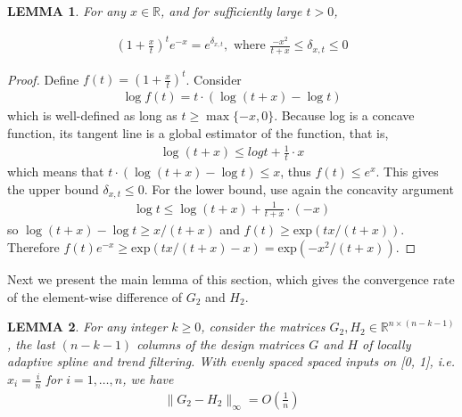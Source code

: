 \documentclass[a4paper]{article}
\newtheorem{lemma}{LEMMA}
\newcommand{\RR}{\mathbb{R}}
\begin{document}
\begin{lemma}
For any $x\in\RR$, and for sufficiently large $t >0$,

\begin{align*}
(1+\frac{x}{t})^te^{-x} = e^{\delta_{x,t}}, \text{ where } \frac{-x^2}{t+x} \leq \delta_{x,t} \leq 0
\end{align*}
\label{lemma:expbound}
\end{lemma}
\begin{proof}
Define $f(t) = (1+\frac{x}{t})^t$. Consider 
\begin{align*}
\log f(t) = t\cdot (\log(t+x) - \log t)
\end{align*}
which is well-defined as long as $t\geq \max\{-x, 0\}$. Because log is a concave function, its tangent line is a global estimator of the function, that is,
\begin{align*}
\log(t+x) \leq log t + \frac{1}{t}\cdot x
\end{align*}
which means that $t\cdot (\log(t+x) - \log t)\leq x$, thus $f(t) \leq e^x$. This gives the upper bound $\delta_{x,t}\leq 0$. For the lower bound, use again the concavity argument
\begin{align*}
\log t\leq \log(t+x) + \frac{1}{t+x}\cdot(-x)
\end{align*}
so $\log(t+x) - \log t \geq x/(t+x)$ and $f(t) \geq \mbox{exp}(tx/(t+x))$. Therefore $f(t)e^{-x}\geq \mbox{exp}(tx/(t+x) - x) = \mbox{exp}(-x^2/(t+x))$.
\end{proof}

Next we present the main lemma of this section, which gives the convergence rate of the element-wise difference of $G_2$ and $H_2$.

\begin{lemma}
For any integer $k\geq 0$, consider the matrices $G_2, H_2\in\RR^{n\times (n-k-1)}$, the last $(n-k-1)$ columns of the design matrices $G$ and $H$ of locally adaptive spline and trend filtering. With evenly spaced spaced inputs on [0, 1], i.e. $x_i = \frac{i}{n}$ for $i=1,\ldots, n$, we have
\begin{align*}
\|G_2-H_2\|_\infty = O(\frac{1}{n})
\end{align*}
\label{lemma:diff_order}
\end{lemma}
\end{document}
